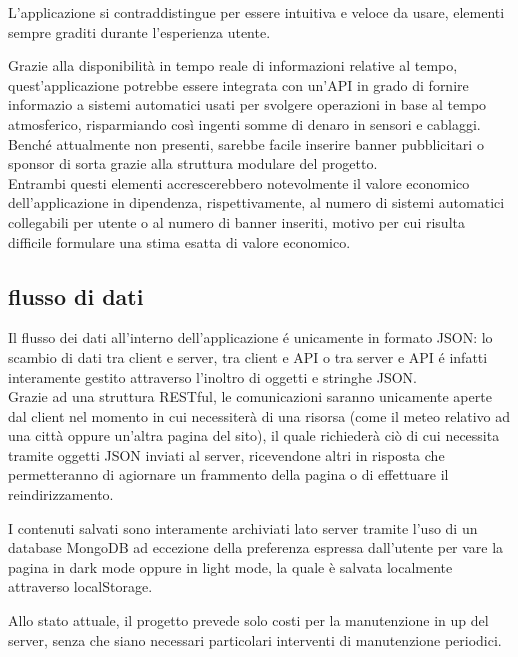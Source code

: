 L'applicazione si contraddistingue per essere intuitiva e veloce da usare, elementi sempre graditi durante l'esperienza utente.

\vspace{5mm}

Grazie alla disponibilità in tempo reale di informazioni relative al tempo, quest'applicazione potrebbe essere integrata con 
un'API in grado di fornire informazio a sistemi automatici usati per svolgere operazioni in base al tempo atmosferico, 
risparmiando così ingenti somme di denaro in sensori e cablaggi.\\
Benché attualmente non presenti, sarebbe facile inserire banner pubblicitari o sponsor di sorta grazie alla struttura modulare 
del progetto.\\
Entrambi questi elementi accrescerebbero notevolmente il valore economico dell'applicazione in dipendenza, rispettivamente, al 
numero di sistemi automatici collegabili per utente o al numero di banner inseriti, motivo per cui risulta difficile formulare 
una stima esatta di valore economico.

\subsection{flusso di dati}

Il flusso dei dati all'interno dell'applicazione é unicamente in formato JSON: lo scambio di dati tra client e server, tra 
client e API o tra server e API é infatti interamente gestito attraverso l'inoltro di oggetti e stringhe JSON.\\
Grazie ad una struttura RESTful, le comunicazioni saranno unicamente aperte dal client nel momento in cui necessiterà di una risorsa 
(come il meteo relativo ad una città oppure un'altra pagina del sito), il quale richiederà ciò di cui necessita tramite 
oggetti JSON inviati al server, ricevendone altri in risposta che permetteranno di agiornare un frammento della pagina o di effettuare 
il reindirizzamento.

\vspace{5mm}

I contenuti salvati sono interamente archiviati lato server tramite l'uso di un database MongoDB ad eccezione della preferenza 
espressa dall'utente per vare la pagina in dark mode oppure in light mode, la quale è salvata localmente attraverso 
localStorage.

\vspace{5mm}

Allo stato attuale, il progetto prevede solo costi per la manutenzione in up del server, senza che siano necessari particolari 
interventi di manutenzione periodici. 

